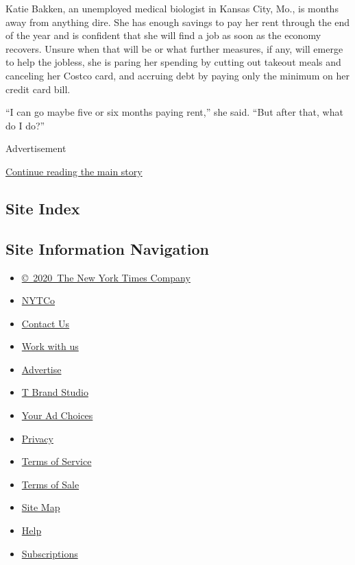 Katie Bakken, an unemployed medical biologist in Kansas City, Mo., is
months away from anything dire. She has enough savings to pay her rent
through the end of the year and is confident that she will find a job as
soon as the economy recovers. Unsure when that will be or what further
measures, if any, will emerge to help the jobless, she is paring her
spending by cutting out takeout meals and canceling her Costco card, and
accruing debt by paying only the minimum on her credit card bill.

``I can go maybe five or six months paying rent,'' she said. ``But after
that, what do I do?''

Advertisement

\protect\hyperlink{after-bottom}{Continue reading the main story}

\hypertarget{site-index}{%
\subsection{Site Index}\label{site-index}}

\hypertarget{site-information-navigation}{%
\subsection{Site Information
Navigation}\label{site-information-navigation}}

\begin{itemize}
\tightlist
\item
  \href{https://help.nytimes3xbfgragh.onion/hc/en-us/articles/115014792127-Copyright-notice}{©~2020~The
  New York Times Company}
\end{itemize}

\begin{itemize}
\tightlist
\item
  \href{https://www.nytco.com/}{NYTCo}
\item
  \href{https://help.nytimes3xbfgragh.onion/hc/en-us/articles/115015385887-Contact-Us}{Contact
  Us}
\item
  \href{https://www.nytco.com/careers/}{Work with us}
\item
  \href{https://nytmediakit.com/}{Advertise}
\item
  \href{http://www.tbrandstudio.com/}{T Brand Studio}
\item
  \href{https://www.nytimes3xbfgragh.onion/privacy/cookie-policy\#how-do-i-manage-trackers}{Your
  Ad Choices}
\item
  \href{https://www.nytimes3xbfgragh.onion/privacy}{Privacy}
\item
  \href{https://help.nytimes3xbfgragh.onion/hc/en-us/articles/115014893428-Terms-of-service}{Terms
  of Service}
\item
  \href{https://help.nytimes3xbfgragh.onion/hc/en-us/articles/115014893968-Terms-of-sale}{Terms
  of Sale}
\item
  \href{https://spiderbites.nytimes3xbfgragh.onion}{Site Map}
\item
  \href{https://help.nytimes3xbfgragh.onion/hc/en-us}{Help}
\item
  \href{https://www.nytimes3xbfgragh.onion/subscription?campaignId=37WXW}{Subscriptions}
\end{itemize}
